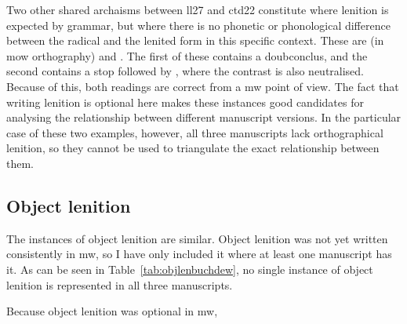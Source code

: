 Two other shared archaisms between \gls{ll27} and \gls{ctd22} constitute where lenition is expected by grammar, but where there is no phonetic or phonological difference between the radical and the lenited form in this specific context. These are (in \gls{mow} orthography)  and . The first of these contains a \gls{doubconclus}, and the second contains a stop followed by , where the contrast is also neutralised. Because of this, both readings are correct from a \gls{mw} point of view. The  fact that writing lenition is optional here makes these instances good candidates for analysing the relationship between different manuscript versions. In the particular case of these two examples, however, all three manuscripts lack orthographical lenition, so they cannot be used to triangulate the exact relationship between them.


\subsection{Object lenition}
\label{sec:object-lenition-1}


The instances of object lenition are similar. Object lenition was not yet written consistently in \gls{mw}, so I have only included it where at least one manuscript has it. As can be seen in Table~\ref{tab:objlenbuchdew}, no single instance of object lenition is represented in all three manuscripts.

Because object lenition was optional in \gls{mw}, 

